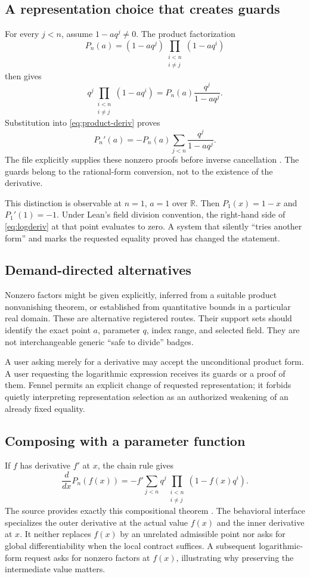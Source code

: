 \documentclass[11pt,a4paper]{article}
\theoremstyle{definition}
\theoremstyle{remark}
\newcommand{\RR}{\mathbb R}
\begin{document}
\subsection{A representation choice that creates guards}
For every $j<n$, assume $1-aq^j\ne0$. The product factorization
\[
 P_n(a)=(1-aq^j)\prod_{\substack{i<n\\i\ne j}}(1-aq^i)
\]
then gives
\[
 q^j\prod_{\substack{i<n\\i\ne j}}(1-aq^i)
 =P_n(a)\frac{q^j}{1-aq^j}.
\]
Substitution into \eqref{eq:product-deriv} proves
\begin{equation}\label{eq:logderiv}
 P_n'(a)=-P_n(a)\sum_{j<n}\frac{q^j}{1-aq^j}.
\end{equation}
The file explicitly supplies these nonzero proofs before inverse cancellation
\cite{qpoch}. The guards belong to the rational-form conversion, not to the
existence of the derivative.

This distinction is observable at $n=1$, $a=1$ over $\RR$. Then $P_1(x)=1-x$
and $P_1'(1)=-1$. Under Lean's field division convention, the right-hand side
of \eqref{eq:logderiv} at that point evaluates to zero. A system that silently
``tries another form'' and marks the requested equality proved has changed
the statement.

\subsection{Demand-directed alternatives}
Nonzero factors might be given explicitly, inferred from a suitable product
nonvanishing theorem, or established from quantitative bounds in a particular
real domain. These are alternative registered routes. Their support sets
should identify the exact point $a$, parameter $q$, index range, and selected
field. They are not interchangeable generic ``safe to divide'' badges.

A user asking merely for a derivative may accept the unconditional product
form. A user requesting the logarithmic expression receives its guards or a
proof of them. Fennel permits an explicit change of requested representation;
it forbids quietly interpreting representation selection as an authorized
weakening of an already fixed equality.

\subsection{Composing with a parameter function}
If $f$ has derivative $f'$ at $x$, the chain rule gives
\[
 \frac{d}{dx}P_n(f(x))
 =-f'\sum_{j<n}q^j\prod_{\substack{i<n\\i\ne j}}(1-f(x)q^i).
\]
The source provides exactly this compositional theorem \cite{qpoch}. The
behavioral interface specializes the outer derivative at the actual value
$f(x)$ and the inner derivative at $x$. It neither replaces $f(x)$ by an
unrelated admissible point nor asks for global differentiability when the local
contract suffices. A subsequent logarithmic-form request asks for nonzero
factors at $f(x)$, illustrating why preserving the intermediate value matters.
\end{document}
